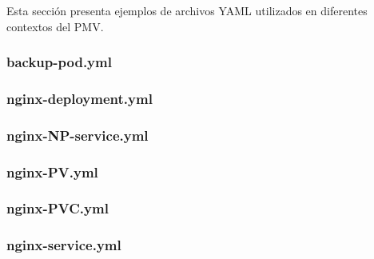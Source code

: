 \noindent
Esta sección presenta ejemplos de archivos YAML utilizados en diferentes contextos del PMV.
\subsubsection{backup-pod.yml}
\noindent


\subsubsection{nginx-deployment.yml}
\noindent


\subsubsection{nginx-NP-service.yml}
\noindent


\subsubsection{nginx-PV.yml}
\noindent


\subsubsection{nginx-PVC.yml}
\noindent


\subsubsection{nginx-service.yml}
\noindent
